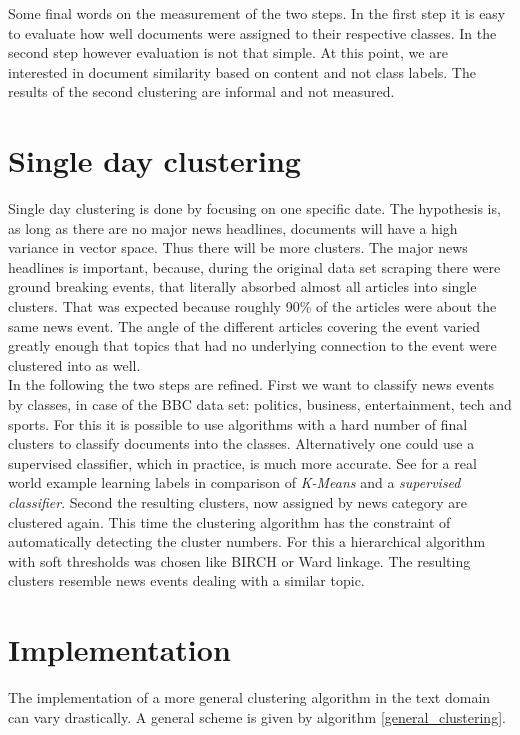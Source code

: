 Some final words on the measurement of the two steps. In the first step it is easy to evaluate how well documents were assigned to their respective classes. In the second step however evaluation is not that simple. At this point, we are interested in document similarity based on content and not class labels. The results of the second clustering are informal and not measured.

\section{Single day clustering}

Single day clustering is done by focusing on one specific date. The hypothesis is, as long as there are no major news headlines, documents will have a high variance in vector space. Thus there will be more clusters. The major news headlines is important, because, during the original data set scraping there were ground breaking events, that literally absorbed almost all articles into single clusters. That was expected because roughly 90\% of the articles were about the same news event. The angle of the different articles covering the event varied greatly enough that topics that had no underlying connection to the event were clustered into as well.\\

In the following the two steps are refined. First we want to classify news events by classes, in case of the BBC data set: politics, business, entertainment, tech and sports. For this it is possible to use algorithms with a hard number of final clusters to classify documents into the classes. Alternatively one could use a supervised classifier, which in practice, is much more accurate. See \cite{LearningMultiLabelKmeans2013} for a real world example learning labels in comparison of \emph{K-Means} and a \emph{supervised classifier}. Second the resulting clusters, now assigned by news category are clustered again. This time the clustering algorithm has the constraint of automatically detecting the cluster numbers. For this a hierarchical algorithm with soft thresholds was chosen like BIRCH or Ward linkage. The resulting clusters resemble news events dealing with a similar topic. 

\section{Implementation}
The implementation of a more general clustering algorithm in the text domain can vary drastically. A general scheme is given by algorithm \ref{general_clustering}.

